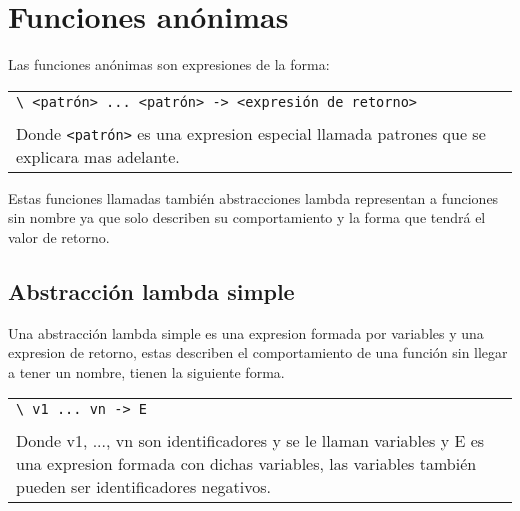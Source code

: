 
\titlespacing{\subsection}{0pt}{10pt}{0pt}

\chapter{Funciones anónimas}
   Las funciones anónimas son expresiones de la forma:
   
   \begin{longtable}[c]{l}
      \texttt{\textbackslash~<patrón>~...~<patrón>~\texttt{->}~<expresión de retorno>}\\ \\
      \begin{minipage}{15cm}
         Donde \texttt{<patrón>} es una expresion especial llamada patrones que se explicara mas adelante.
      \end{minipage}
   \end{longtable}
   
   Estas funciones llamadas también abstracciones lambda representan a funciones sin nombre ya que solo describen su comportamiento y la forma que tendrá el valor de retorno.
   
   \section{Abstracción lambda simple}
      Una abstracción lambda simple es una expresion formada por variables y una expresion de retorno, estas describen el comportamiento de una función sin llegar a tener un nombre, tienen la siguiente forma.
      
      \begin{longtable}[c]{l}
         \texttt{\textbackslash~v1~...~vn~\texttt{->}~E}\\\\
         \begin{minipage}{15cm}
            Donde v1, ..., vn son identificadores y se le llaman variables y E es una expresion formada con dichas variables, las variables también pueden ser identificadores negativos.
         \end{minipage}
      \end{longtable}
      
